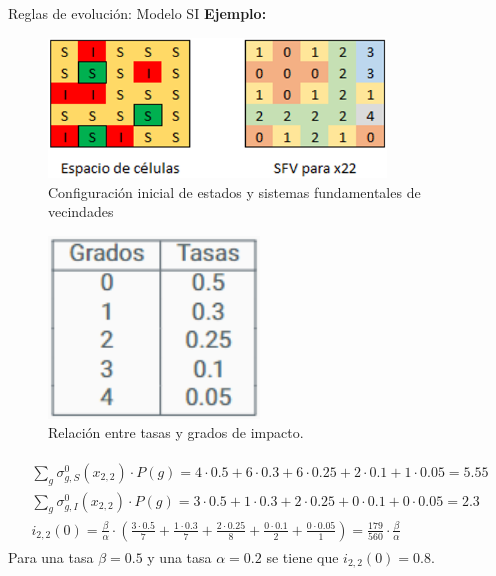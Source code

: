 \documentclass[9pt]{beamer}
\begin{document}
\begin{frame}{Reglas de evolución: Modelo SI}
\textbf{Ejemplo:}

\begin{minipage}{0.55\textwidth}
\begin{figure}[h]
  \centering
    \includegraphics[width=0.8\textwidth]{Imagenes/cellSpacePresentation.png}
    \caption{Configuración inicial de estados y sistemas fundamentales de vecindades}
    \label{fig:configuraciónInicialEspacio25Celulas}
\end{figure}
\end{minipage}
\hfill
\begin{minipage}{0.4\textwidth}
\begin{figure}[h]
  \centering
    \includegraphics[width=0.5\textwidth]{Imagenes/RelacionTasasYGrados_Ex_SI.png}
    \caption{Relación entre tasas y grados de impacto.}
\end{figure}
\end{minipage}

\begin{align*}
    \begin{array}{l}
        \sum_g\sigma_{g,S}^0(x_{2,2})\cdot P(g) = 4\cdot0.5+6\cdot0.3+6\cdot0.25+2\cdot0.1+1\cdot0.05 = 5.55 \\
        \sum_g\sigma_{g,I}^0(x_{2,2})\cdot P(g) = 3\cdot0.5+1\cdot0.3+2\cdot0.25+0\cdot0.1+0\cdot0.05 = 2.3\\
        i_{2,2}(0) = \frac{\beta}{\alpha}\cdot\left(\frac{3\cdot0.5}{7}+\frac{1\cdot0.3}{7}+\frac{2\cdot0.25}{8}+\frac{0\cdot0.1}{2}+\frac{0\cdot0.05}{1}\right)=\frac{179}{560}\cdot\frac{\beta}{\alpha}
    \end{array}
\end{align*}
Para una tasa $\beta=0.5$ y una tasa $\alpha=0.2$ se tiene que $i_{2,2}(0)=0.8$.
\end{frame}
\end{document}

